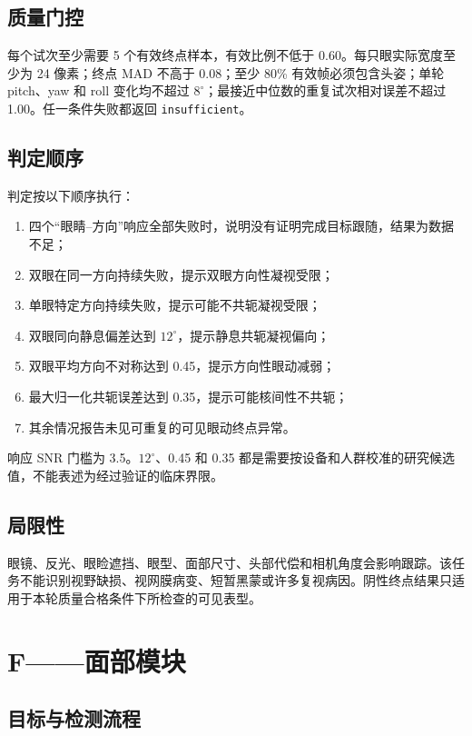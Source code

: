 \documentclass[11pt,a4paper]{article}
\begin{document}
\subsection{质量门控}

每个试次至少需要 5 个有效终点样本，有效比例不低于 0.60。每只眼实际宽度至少为 24 像素；终点 MAD 不高于 0.08；至少 80\% 有效帧必须包含头姿；单轮 pitch、yaw 和 roll 变化均不超过 $8^{\circ}$；最接近中位数的重复试次相对误差不超过 1.00。任一条件失败都返回 \texttt{insufficient}。

\subsection{判定顺序}

判定按以下顺序执行：

\begin{enumerate}
  \item 四个“眼睛--方向”响应全部失败时，说明没有证明完成目标跟随，结果为数据不足；
  \item 双眼在同一方向持续失败，提示双眼方向性凝视受限；
  \item 单眼特定方向持续失败，提示可能不共轭凝视受限；
  \item 双眼同向静息偏差达到 $12^{\circ}$，提示静息共轭凝视偏向；
  \item 双眼平均方向不对称达到 0.45，提示方向性眼动减弱；
  \item 最大归一化共轭误差达到 0.35，提示可能核间性不共轭；
  \item 其余情况报告未见可重复的可见眼动终点异常。
\end{enumerate}

响应 SNR 门槛为 3.5。$12^{\circ}$、0.45 和 0.35 都是需要按设备和人群校准的研究候选值，不能表述为经过验证的临床界限。

\subsection{局限性}

眼镜、反光、眼睑遮挡、眼型、面部尺寸、头部代偿和相机角度会影响跟踪。该任务不能识别视野缺损、视网膜病变、短暂黑蒙或许多复视病因。阴性终点结果只适用于本轮质量合格条件下所检查的可见表型。

\section{F——面部模块}

\subsection{目标与检测流程}
\end{document}
